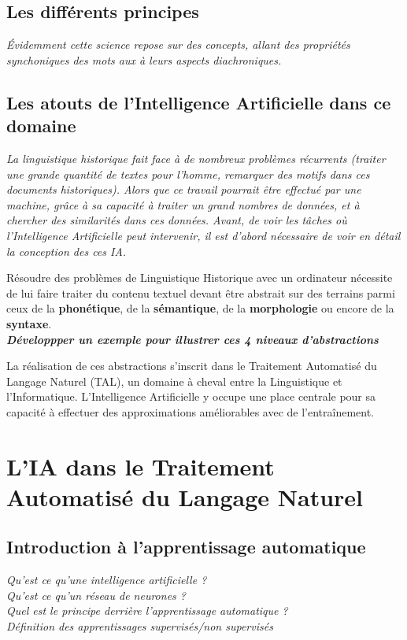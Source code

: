 \documentclass[12pt, a4, french]{report}
\begin{document}
\subsection{Les différents principes}
\textit{Évidemment cette science repose sur des concepts, allant des propriétés synchoniques des mots aux à leurs aspects diachroniques.}
\subsection{Les atouts de l'Intelligence Artificielle dans ce domaine}
\textit{La linguistique historique fait face à de nombreux problèmes récurrents (traiter une grande quantité de textes pour l'homme, remarquer des motifs dans ces documents historiques). Alors que ce travail pourrait être effectué par une machine, grâce à sa capacité à traiter un grand nombres de données, et à chercher des similarités dans ces données. Avant, de voir les tâches où l'Intelligence Artificielle peut intervenir, il est d'abord nécessaire de voir en détail la conception des ces IA.}

Résoudre des problèmes de Linguistique Historique avec un ordinateur nécessite de lui faire traiter
du contenu textuel devant être abstrait sur des terrains parmi ceux de la \textbf{phonétique}, de la
\textbf{sémantique}, de la \textbf{morphologie} ou encore de la \textbf{syntaxe}.\\
\textbf{\textit{Développper un exemple pour illustrer ces 4 niveaux d'abstractions}}

La réalisation de ces abstractions s'inscrit dans le Traitement Automatisé du Langage Naturel (TAL),
un domaine à cheval entre la Linguistique et l'Informatique. L'Intelligence Artificielle y occupe
une place centrale pour sa capacité à effectuer des approximations améliorables avec de l'entraînement.


\section{L'IA dans le Traitement Automatisé du Langage Naturel}
\subsection{Introduction à l'apprentissage automatique}
\textit{Qu'est ce qu'une intelligence artificielle ?\\
    Qu'est ce qu'un réseau de neurones ?\\
    Quel est le principe derrière l'apprentissage automatique ?\\
    Définition des apprentissages supervisés/non supervisés}
\end{document}
